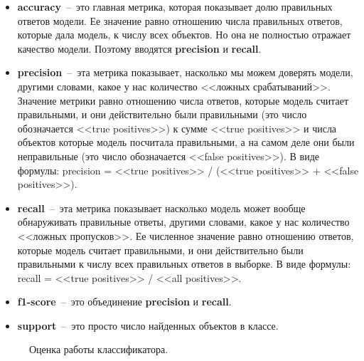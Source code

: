 \documentclass[12pt, a4paper]{article}
\begin{document}
    \begin{itemize}
        \item \textbf{accuracy}~--~это главная метрика, которая показывает долю 
        правильных ответов модели. Ее значение равно отношению числа правильных 
        ответов, которые дала модель, к числу всех объектов. Но она не полностью 
        отражает качество модели. Поэтому вводятся \textbf{precision} и 
        \textbf{recall}.
        
        \item \textbf{precision}~--~эта метрика показывает, насколько мы можем 
        доверять модели, другими словами, какое у нас количество <<ложных 
        срабатываний>>. Значение метрики равно отношению числа ответов, которые 
        модель считает правильными, и они действительно были правильными (это 
        число обозначается <<true positives>>) к сумме <<true positives>> и числа 
        объектов которые модель посчитала правильными, а на самом деле они были 
        неправильные (это число обозначается <<false positives>>). В виде формулы: 
        precision = <<true positives>> / (<<true positives>> + <<false 
        positives>>).
        
        \item \textbf{recall}~--~эта метрика показывает насколько модель может 
        вообще обнаруживать правильные ответы, другими словами, какое у нас 
        количество <<ложных пропусков>>. Ее численное значение равно отношению 
        ответов, которые модель считает правильными, и они действительно были 
        правильными к числу всех правильных ответов в выборке. В виде формулы: 
        recall = <<true positives>> / <<all positives>>.
        
        \item \textbf{f1-score}~--~это объединение \textbf{precision} и 
        \textbf{recall}.
        
        \item \textbf{support}~--~это просто число найденных объектов в классе.
    \end{itemize}
    
    \begin{figure} [h]
        \caption{Оценка работы классификатора.}
        \label{image3}
    \end{figure}
    
\end{document}
